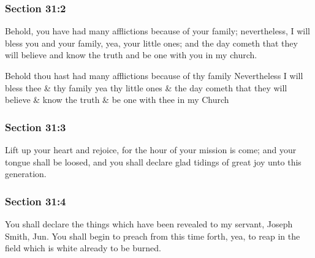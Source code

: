 	\subsubsection{Section 31:2} %
		\label{DC31-2}

		Behold, you have had many afflictions because of your family; nevertheless, I will bless you and your family, yea, your little ones; and the day cometh that they will believe and know the truth and be one with you in my church.

		\begin{framed}
		\scriptsize
			\begin{compactdesc}
				\item[JSP] Behold thou hast had many afflictions because of thy family Nevertheless I will bless thee \& thy family yea thy little ones \& the day cometh that they will believe \& know the truth \& be one with thee in my Church
			\end{compactdesc}
		\end{framed}

	\subsubsection{Section 31:3} %
		\label{DC31-3}

		Lift up your heart and rejoice, for the hour of your mission is come; and your tongue shall be loosed, and you shall declare glad tidings of great joy unto this generation.


	\subsubsection{Section 31:4} %
		\label{DC31-4}

		You shall declare the things which have been revealed to my servant, Joseph Smith, Jun. You shall begin to preach from this time forth, yea, to reap in the field which is white already to be burned.

